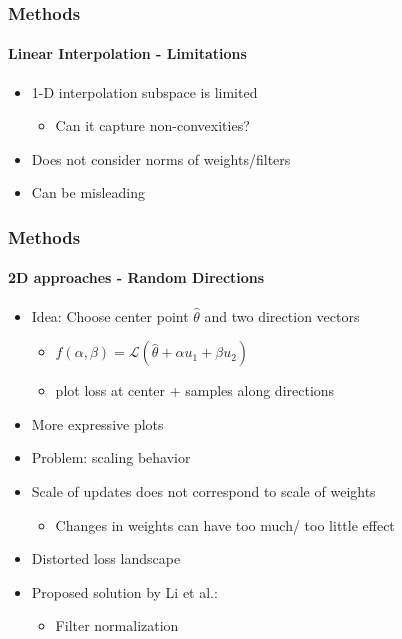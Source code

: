\documentclass[9pt]{beamer}
\begin{document}
\begin{frame}
\frametitle{Methods}
\framesubtitle{Linear Interpolation - Limitations}
\begin{itemize}
	\item 1-D interpolation subspace is limited
	\begin{itemize}
		\item Can it capture non-convexities?
	\end{itemize}
	\item Does not consider norms of weights/filters
	\item Can be misleading
\end{itemize}
\end{frame} 



\begin{frame}
\frametitle{Methods}
\framesubtitle{2D approaches - Random Directions}
\begin{itemize}%
	\item Idea: Choose center point $\hat{\theta}$ and two direction vectors
	\begin{itemize}
	\item $f(\alpha, \beta) = \mathcal{L}(\hat{\theta }+ \alpha u_1 + \beta u_2)$
	\item plot loss at center + samples along directions
	\end{itemize}
	\item More expressive plots
	\item Problem: scaling behavior
	\item Scale of updates does not correspond to scale of weights
	\begin{itemize}
		\item Changes in weights can have too much/ too little effect
	\end{itemize}
	\item Distorted loss landscape
	\item Proposed solution by Li et al.:
	\begin{itemize}
		\item Filter normalization
	\end{itemize}
\end{itemize}
\end{frame} 
\end{document}
